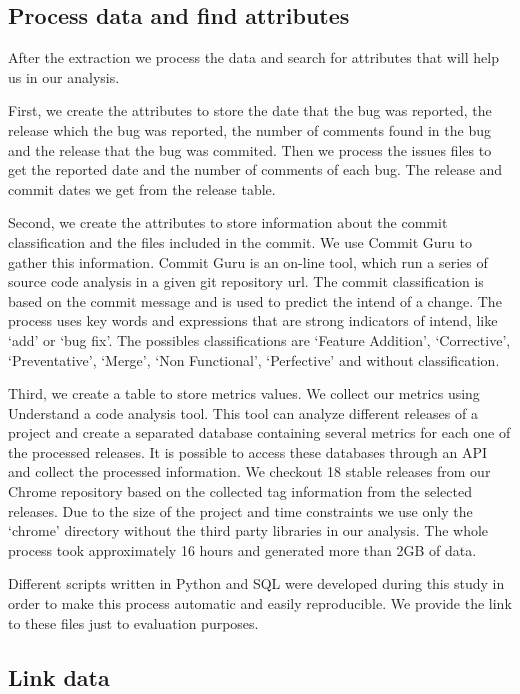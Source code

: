 \subsection{Process data and find attributes}

After the extraction we process the data and search for attributes that will help us in our analysis. 

First, we create the attributes to store the date that the bug was reported, the release which the bug was reported, the number of comments found in the bug and the release that the bug was commited. Then we process the issues files to get the reported date and the number of comments of each bug. The release and commit dates we get from the release table. 

Second, we create the attributes to store information about the commit classification and the files included in the commit. We use Commit Guru\cite{commit_guru} to gather this information. Commit Guru is an on-line tool, which run a series of source code analysis in a given git repository url. The commit classification is based on the commit message and is used to predict the intend of a change. The process uses key words and expressions that are strong indicators of intend, like `add' or `bug fix'. The possibles classifications are `Feature Addition', `Corrective', `Preventative', `Merge', `Non Functional', `Perfective' and without classification.

Third, we create a table to store metrics values. We collect our metrics using Understand a code analysis tool. This tool can analyze different releases of a project and create a separated database containing several metrics \cite{understand_metrics} for each one of the processed releases. It is possible to access these databases through an API and collect the processed information. We checkout 18 stable releases from our Chrome repository based on the collected tag information from the selected releases. Due to the size of the project and time constraints we use only the `chrome' directory without the third party libraries in our analysis. The whole process took approximately 16 hours and generated more than 2GB of data. 

Different scripts written in Python and SQL were developed during this study in order to make this process automatic and easily reproducible. We provide the link to these files just to evaluation purposes.

\subsection{Link data}

